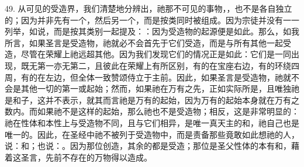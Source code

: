 49. 从可见的受造界，我们清楚地分辨出，祂那不可见的事物，，也不是各自独立的；因为并非先有一个，然后另一个，而是按类同时被组成。因为宗徒并没有一一列举，如说，而是按其类别一起提及：：因为受造物的起源便是如此。那么，如我所言，如果圣言是受造物，祂就必不会首先于它们受造，而是与所有其他一起受造，尽管在荣耀上祂远超其他。因为我们发现它们的情况正是如此：它们是一同出现，既无第一亦无第二，且彼此在荣耀上有所区别，有的在宝座右边，有的环绕四周，有的在左边，但全体一致赞颂侍立于主前。因此，如果圣言是受造物，祂就不会是其他一切的第一或起始；然而，如果祂在万有之先，正如实际所是，且唯独祂是和子，这并不表示，就其而言祂是万有的起始，因为万有的起始本身就在万有之数内。而如果祂不是这样的起始，那么祂也不是受造物；相反，这是非常明显的：祂在性体和本性上与受造物不同，且与它们相异，是唯一真天主的和，祂自己也是唯一的。因此，在圣经中祂不被列于受造物中，而是责备那些竟敢如此想祂的人，说：和；也说：。因为那位创造，其余的都是受造；那位是圣父性体的本有和，藉着这圣言，先前不存在的万物得以造成。\par

